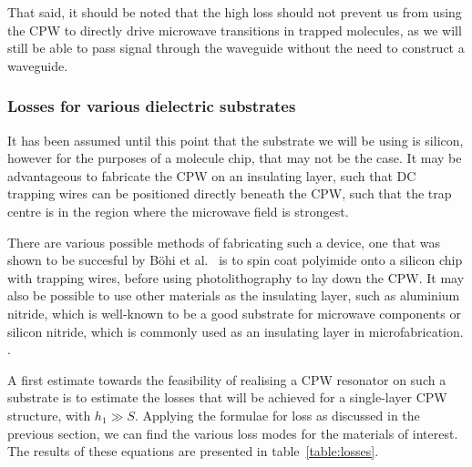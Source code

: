 That said, it should be noted that the high loss should not prevent us from
using the CPW to directly drive microwave transitions in trapped molecules, as
we will still be able to pass signal through the waveguide without the need to
construct a waveguide.


\subsubsection{Losses for various dielectric substrates}

It has been assumed until this point that the substrate we will be using is
silicon, however for the purposes of a molecule chip, that may not be the case.
It may be advantageous to fabricate the CPW on an insulating layer, such that
DC trapping wires can be positioned directly beneath the CPW, such that the trap
centre is in the region where the microwave field is strongest.

There are various possible methods of fabricating such a device, one that was
shown to be succesful by B\"ohi et al.~\cite{Boehi2009} is to spin coat
polyimide onto a silicon chip with trapping wires, before using photolithography
to lay down the CPW. It may also be possible to use other materials as the
insulating layer, such as aluminium nitride, which is well-known to be a good
substrate for microwave components  or silicon nitride, which is
commonly used as an insulating layer in microfabrication. .

A first estimate towards the feasibility of realising a CPW resonator on such a
substrate is to estimate the losses that will be achieved for a single-layer CPW
structure, with $h_1 \gg S$. Applying the formulae for loss as discussed in the
previous section, we can find the various loss modes for the materials of
interest. The results of these equations are presented in
table~\ref{table:losses}.

